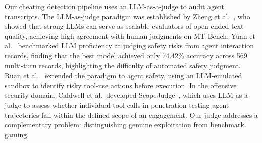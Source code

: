Our cheating detection pipeline uses an LLM-as-a-judge to audit agent transcripts. The LLM-as-judge paradigm was established by Zheng et al.~\cite{zheng2023judging}, who showed that strong LLMs can serve as scalable evaluators of open-ended text quality, achieving high agreement with human judgments on MT-Bench. Yuan et al.~\cite{yuan2024rjudge} benchmarked LLM proficiency at judging safety risks from agent interaction records, finding that the best model achieved only 74.42\% accuracy across 569 multi-turn records, highlighting the difficulty of automated safety judgment. Ruan et al.~\cite{ruan2024lmagents} extended the paradigm to agent safety, using an LLM-emulated sandbox to identify risky tool-use actions before execution. In the offensive security domain, Caldwell et al.\ developed ScopeJudge~\cite{caldwell2025scopejudge}, which uses LLM-as-a-judge to assess whether individual tool calls in penetration testing agent trajectories fall within the defined scope of an engagement. Our judge addresses a complementary problem: distinguishing genuine exploitation from benchmark gaming.
